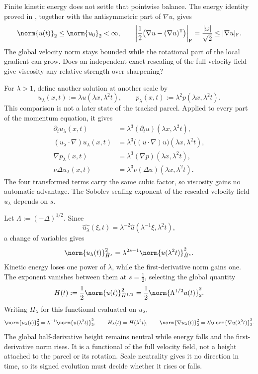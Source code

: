 Finite kinetic energy does not settle that pointwise balance. The energy identity proved in , together with the antisymmetric part of \(\nabla u\), gives
\[
  \norm{u(t)}_2
  \leq
  \norm{u_0}_2
  <\infty,
  \qquad
  \left|\frac12\bigl(\nabla u-(\nabla u)^{\mathsf T}\bigr)\right|_{\mathrm F}
  =
  \frac{|\omega|}{\sqrt2}
  \leq
  |\nabla u|_{\mathrm F}.
\]
The global velocity norm stays bounded while the rotational part of the local gradient can grow. Does an independent exact rescaling of the full velocity field give viscosity any relative strength over sharpening?


For \(\lambda>1\), define another solution at another scale by
\[
  u_\lambda(x,t)
  :=
  \lambda u(\lambda x,\lambda^2t),
  \qquad
  p_\lambda(x,t)
  :=
  \lambda^2p(\lambda x,\lambda^2t).
\]
This comparison is not a later state of the tracked parcel. Applied to every part of the momentum equation, it gives
\[
\begin{aligned}
  \partial_tu_\lambda(x,t)
  &=
  \lambda^3(\partial_tu)(\lambda x,\lambda^2t),
  \\
  (u_\lambda\cdot\nabla)u_\lambda(x,t)
  &=
  \lambda^3\bigl((u\cdot\nabla)u\bigr)(\lambda x,\lambda^2t),
  \\
  \nabla p_\lambda(x,t)
  &=
  \lambda^3(\nabla p)(\lambda x,\lambda^2t),
  \\
  \nu\Delta u_\lambda(x,t)
  &=
  \lambda^3\nu(\Delta u)(\lambda x,\lambda^2t).
\end{aligned}
\]
The four transformed terms carry the same cubic factor, so viscosity gains no automatic advantage. The Sobolev scaling exponent of the rescaled velocity field \(u_\lambda\) depends on \(s\).


Let \(\Lambda:=(-\Delta)^{1/2}\). Since
\[
  \widehat{u_\lambda}(\xi,t)
  =
  \lambda^{-2}\widehat u(\lambda^{-1}\xi,\lambda^2t),
\]
a change of variables gives
\[
  \norm{u_\lambda(t)}_{\dot H^s}^2
  =
  \lambda^{2s-1}
  \norm{u(\lambda^2t)}_{\dot H^s}^2.
\]
Kinetic energy loses one power of \(\lambda\), while the first-derivative norm gains one. The exponent vanishes between them at \(s=\tfrac12\), selecting the global quantity
\[
  H(t)
  :=
  \frac12\norm{u(t)}_{\dot H^{1/2}}^2
  =
  \frac12\norm{\Lambda^{1/2}u(t)}_2^2.
\]
Writing \(H_\lambda\) for this functional evaluated on \(u_\lambda\),
\[
  \norm{u_\lambda(t)}_2^2
  =
  \lambda^{-1}\norm{u(\lambda^2t)}_2^2,
  \qquad
  H_\lambda(t)=H(\lambda^2t),
  \qquad
  \norm{\nabla u_\lambda(t)}_2^2
  =
  \lambda\norm{\nabla u(\lambda^2t)}_2^2.
\]
The global half-derivative height remains neutral while energy falls and the first-derivative norm rises. It is a functional of the full velocity field, not a height attached to the parcel or its rotation. Scale neutrality gives it no direction in time, so its signed evolution must decide whether it rises or falls.

